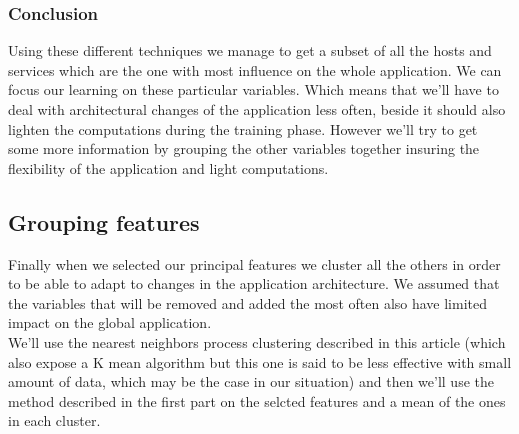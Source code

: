 \documentclass[10pt,a4paper,oneside]{article}
\begin{document}
\begin{multicols}{2}
\subsubsection{Conclusion}
Using these different techniques we manage to get a subset of all the hosts and services which are the one with most influence on the whole application. We can focus our learning on these particular variables. Which means that we'll have to deal with architectural changes of the application less often, beside it should also lighten the computations during the training phase. However we'll try to get some more information by grouping the other variables together insuring the flexibility of the application and light computations.\\
\subsection{Grouping features}
Finally when we selected our principal features we cluster all the others in order to be able to adapt to changes in the application architecture. We assumed that the variables that will be removed and added the most often also have limited impact on the global application.\\
We'll use the nearest neighbors process clustering described in this article \cite{ref5} (which also expose a K mean algorithm but this one is said to be less effective with small amount of data, which may be the case in our situation) and then we'll use the method described in the first part on the selcted features and a mean of the ones in each cluster.



\end{multicols}


 

\end{document}
